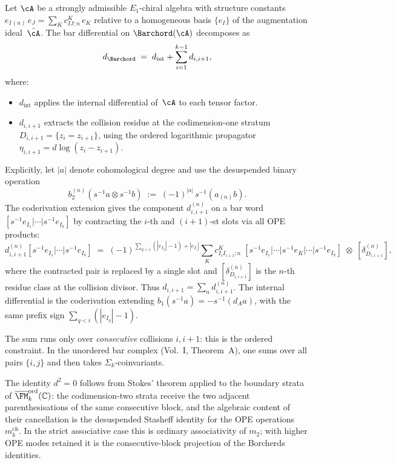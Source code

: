 \begin{construction}
\label{constr:bar-diff-collision}
Let $\cA$ be a strongly admissible $E_1$-chiral algebra with
structure constants $e_I{}_{(n)}\,e_J=\sum_K c^K_{IJ;n}\,e_K$
relative to a homogeneous basis $\{e_I\}$ of the
augmentation ideal~$\bar\cA$. The bar differential on
$\Barchord(\cA)$ decomposes as
\[
d_{\Barchord}
\;=\;
d_{\mathrm{int}}+\sum_{i=1}^{k-1} d_{i,i+1},
\]
where:
\begin{itemize}
\item $d_{\mathrm{int}}$ applies the internal differential
 of~$\cA$ to each tensor factor.
\item $d_{i,i+1}$ extracts the collision residue at the
 codimension-one stratum $D_{i,i+1}=\{z_i=z_{i+1}\}$,
 using the ordered logarithmic propagator
 $\eta_{i,i+1}=d\log(z_i-z_{i+1})$.
\end{itemize}

Explicitly, let $|a|$ denote cohomological degree and use the
desuspended binary operation
\[
b_2^{(n)}(s^{-1}a\otimes s^{-1}b)
\;:=\;
(-1)^{|a|}\,s^{-1}(a_{(n)}b).
\]
The coderivation extension gives the component $d_{i,i+1}^{(n)}$
on a bar word
$[s^{-1}e_{I_1}|\cdots|s^{-1}e_{I_k}]$ by contracting
the $i$-th and $(i{+}1)$-st slots via all OPE products:
\[
d_{i,i+1}^{(n)}
[s^{-1}e_{I_1}|\cdots|s^{-1}e_{I_k}]
\;=\;
(-1)^{\sum_{q<i}(|e_{I_q}|-1)+|e_{I_i}|}
\sum_K c^K_{I_i I_{i+1};n}\;
[s^{-1}e_{I_1}|\cdots|s^{-1}e_K|\cdots|s^{-1}e_{I_k}]
\;\otimes\;[\delta_{D_{i,i+1}}^{(n)}],
\]
where the contracted pair is replaced by a single slot and
$[\delta_{D_{i,i+1}}^{(n)}]$ is the $n$-th residue class at the
collision divisor.
Thus $d_{i,i+1}=\sum_n d_{i,i+1}^{(n)}$. The internal
differential is the coderivation extending
$b_1(s^{-1}a)=-s^{-1}(d_Aa)$, with the same
prefix sign $\sum_{q<i}(|e_{I_q}|-1)$.

The sum runs only over \emph{consecutive} collisions
$i,i{+}1$: this is the ordered constraint. In the unordered
bar complex (Vol.~I, Theorem~A), one sums over all pairs
$\{i,j\}$ and then takes $\Sigma_k$-coinvariants.

The identity $d^2=0$ follows from Stokes' theorem applied
to the boundary strata of
$\overline{\FM}_k^{\mathrm{ord}}(\mathbb C)$: the
codimension-two strata receive the two adjacent parenthesisations of
the same consecutive block, and the algebraic content of their
cancellation is the desuspended Stasheff identity for the OPE operations
$m_k^{\mathrm{ch}}$. In the strict associative case this is ordinary
associativity of $m_2$; with higher OPE modes retained it is the
consecutive-block projection of the Borcherds identities.
\end{construction}

